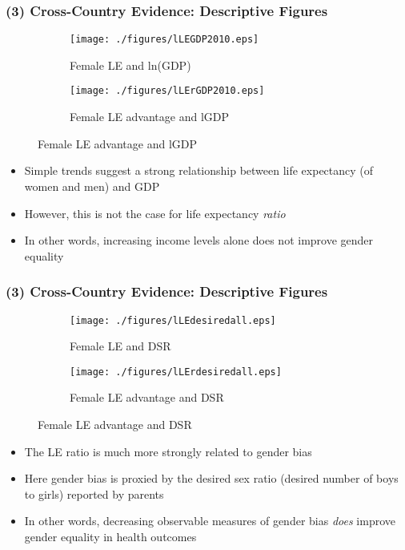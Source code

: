 \documentclass[10pt,letterpaper,subeqn]{beamer}
\begin{document}




\begin{frame}[label=CC1]
\frametitle{(3) Cross-Country Evidence: Descriptive Figures}
\begin{figure}[htpb!]
\centering
\begin{subfigure}{.5\textwidth}
  \centering
  \texttt{[image: ./figures/lLEGDP2010.eps]}
  \caption{Female LE and ln(GDP)}
  \label{TWINfig:fertrend}
\end{subfigure}%
\begin{subfigure}{.5\textwidth}
  \centering
  \texttt{[image: ./figures/lLErGDP2010.eps]}
  \caption{Female LE advantage and lGDP}
  \label{TWINfig:eductrend}
\end{subfigure}
\end{figure}
\begin{itemize}
\item Simple trends suggest a strong relationship between life expectancy (of women and men) and GDP
\item However, this is not the case for life expectancy \emph{ratio}
\item In other words, increasing income levels alone does not improve gender equality
\end{itemize}
\end{frame}


\begin{frame}[label=CC2]
\frametitle{(3) Cross-Country Evidence: Descriptive Figures}
\begin{figure}[htpb!]
\centering
\begin{subfigure}{.5\textwidth}
  \centering
  \texttt{[image: ./figures/lLEdesiredall.eps]}
  \caption{Female LE and DSR}
  \label{TWINfig:fertrend}
\end{subfigure}%
\begin{subfigure}{.5\textwidth}
  \centering
  \texttt{[image: ./figures/lLErdesiredall.eps]}
  \caption{Female LE advantage and DSR}
  \label{TWINfig:eductrend}
\end{subfigure}
\end{figure}
\begin{itemize}
\item The LE ratio is much more strongly related to gender bias
\item Here gender bias is proxied by the desired sex ratio (desired number of boys to girls) reported by parents
\item In other words, decreasing observable measures of gender bias \emph{does} improve gender equality in health outcomes
\end{itemize}

\end{frame}
\end{document}

